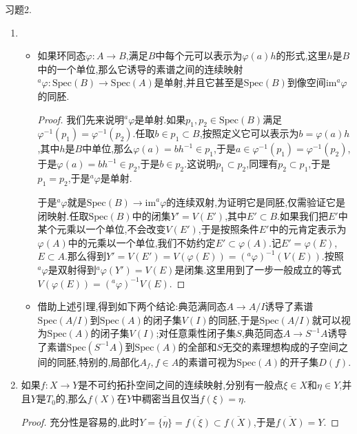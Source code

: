 






习题2.
\begin{enumerate}
	\item 
	\begin{itemize}
		\item 如果环同态$\varphi:A\to B$,满足$B$中每个元可以表示为$\varphi(a)h$的形式,这里$h$是$B$中的一个单位,那么它诱导的素谱之间的连续映射$^a\varphi:\mathrm{Spec}(B)\to\mathrm{Spec}(A)$是单射,并且它甚至是$\mathrm{Spec}(B)$到像空间$\mathrm{im}^a\varphi$的同胚.
		\begin{proof}
			
			我们先来说明$^a\varphi$是单射.如果$p_1,p_2\in\mathrm{Spec}(B)$满足$\varphi^{-1}(p_1)=\varphi^{-1}(p_2)$.任取$b\in p_1\subset B$,按照定义它可以表示为$b=\varphi(a)h$,其中$h$是$B$中单位,那么$\varphi(a)=bh^{-1}\in p_1$,于是$a\in\varphi^{-1}(p_1)=\varphi^{-1}(p_2)$,于是$\varphi(a)=bh^{-1}\in p_2$,于是$b\in p_2$.这说明$p_1\subset p_2$,同理有$p_2\subset p_1$,于是$p_1=p_2$,于是$^a\varphi$是单射.
			
			于是$^a\varphi$就是$\mathrm{Spec}(B)\to\mathrm{im}^a\varphi$的连续双射,为证明它是同胚,仅需验证它是闭映射.任取$\mathrm{Spec}(B)$中的闭集$Y'=V(E')$,其中$E'\subset B$.如果我们把$E'$中某个元乘以一个单位,不会改变$V(E')$,于是按照条件$E'$中的元肯定表示为$\varphi(A)$中的元乘以一个单位,我们不妨约定$E'\subset\varphi(A)$.记$E'=\varphi(E)$,$E\subset A$.那么得到$Y'=V(E')=V(\varphi(E))=(^a\varphi)^{-1}(V(E))$.按照$^a\varphi$是双射得到$^a\varphi(Y')=V(E)$是闭集.这里用到了一步一般成立的等式$V(\varphi(E))=(^a\varphi)^{-1}V(E)$.
		\end{proof}
		\item 借助上述引理,得到如下两个结论:典范满同态$A\to A/I$诱导了素谱$\mathrm{Spec}(A/I)$到$\mathrm{Spec}(A)$的闭子集$V(I)$的同胚,于是$\mathrm{Spec}(A/I)$就可以视为$\mathrm{Spec}(A)$的闭子集$V(I)$;对任意乘性闭子集$S$,典范同态$A\to S^{-1}A$诱导了素谱$\mathrm{Spec}(S^{-1}A)$到$\mathrm{Spec}(A)$的全部和$S$无交的素理想构成的子空间之间的同胚,特别的,局部化$A_f,f\in A$的素谱可视为$\mathrm{Spec}(A)$的开子集$D(f)$.
	\end{itemize}
	\item 如果$f:X\to Y$是不可约拓扑空间之间的连续映射,分别有一般点$\xi\in X$和$\eta\in Y$,并且$Y$是$T_0$的,那么$f(X)$在$Y$中稠密当且仅当$f(\xi)=\eta$.
	\begin{proof}
		
		充分性是容易的,此时$Y=\overline{\{\eta\}}=\overline{f(\xi)}\subset\overline{f(X)}$,于是$\overline{f(X)}=Y$.
		

\end{proof}
\end{enumerate}

